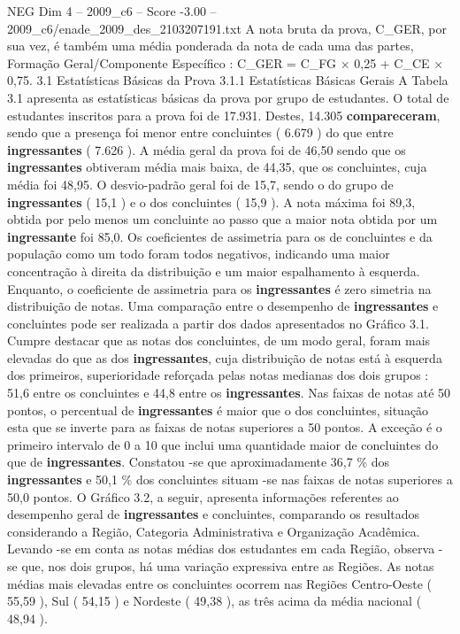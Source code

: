 \begin{textsample}{NEG Dim 4 – 2009\_c6 – Score -3.00 – 2009\_c6/enade\_2009\_des\_2103207191.txt}
A nota bruta da prova, C\_GER, por sua vez, é também uma média ponderada da nota de cada uma das partes, Formação Geral/Componente Específico : C\_GER = C\_FG × 0,25 + C\_CE × 0,75. 3.1 Estatísticas Básicas da Prova 3.1.1 Estatísticas Básicas Gerais A Tabela 3.1 apresenta as estatísticas básicas da prova por grupo de estudantes.
O total de estudantes inscritos para a prova foi de 17.931.
Destes, 14.305 \textbf{compareceram}, sendo que a presença foi menor entre concluintes ( 6.679 ) do que entre \textbf{ingressantes} ( 7.626 ).
A média geral da prova foi de 46,50 sendo que os \textbf{ingressantes} obtiveram média mais baixa, de 44,35, que os concluintes, cuja média foi 48,95.
O desvio-padrão geral foi de 15,7, sendo o do grupo de \textbf{ingressantes} ( 15,1 ) e o dos concluintes ( 15,9 ).
A nota máxima foi 89,3, obtida por pelo menos um concluinte ao passo que a maior nota obtida por um \textbf{ingressante} foi 85,0.
Os coeficientes de assimetria para os de concluintes e da população como um todo foram todos negativos, indicando uma maior concentração à direita da distribuição e um maior espalhamento à esquerda.
Enquanto, o coeficiente de assimetria para os \textbf{ingressantes} é zero simetria na distribuição de notas.
Uma comparação entre o desempenho de \textbf{ingressantes} e concluintes pode ser realizada a partir dos dados apresentados no Gráfico 3.1.
Cumpre destacar que as notas dos concluintes, de um modo geral, foram mais elevadas do que as dos \textbf{ingressantes}, cuja distribuição de notas está à esquerda dos primeiros, superioridade reforçada pelas notas medianas dos dois grupos : 51,6 entre os concluintes e 44,8 entre os \textbf{ingressantes}.
Nas faixas de notas até 50 pontos, o percentual de \textbf{ingressantes} é maior que o dos concluintes, situação esta que se inverte para as faixas de notas superiores a 50 pontos.
A exceção é o primeiro intervalo de 0 a 10 que inclui uma quantidade maior de concluintes do que de \textbf{ingressantes}.
Constatou -se que aproximadamente 36,7 \% dos \textbf{ingressantes} e 50,1 \% dos concluintes situam -se nas faixas de notas superiores a 50,0 pontos.
O Gráfico 3.2, a seguir, apresenta informações referentes ao desempenho geral de \textbf{ingressantes} e concluintes, comparando os resultados considerando a Região, Categoria Administrativa e Organização Acadêmica.
Levando -se em conta as notas médias dos estudantes em cada Região, observa -se que, nos dois grupos, há uma variação expressiva entre as Regiões.
As notas médias mais elevadas entre os concluintes ocorrem nas Regiões Centro-Oeste ( 55,59 ), Sul ( 54,15 ) e Nordeste ( 49,38 ), as três acima da média nacional ( 48,94 ).

\end{textsample}
